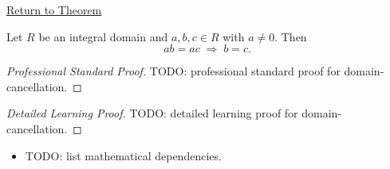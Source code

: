 \newpage
{}
\label{prf:domain-cancellation}

\begin{remark*}[Return]
\hyperref[prop:domain-cancellation]{Return to Theorem}
\end{remark*}

\begin{proposition*}
Let $R$ be an integral domain and $a, b, c \in R$ with $a \neq 0$.
Then
\[
ab = ac \;\Longrightarrow\; b = c.
\]
\end{proposition*}

\begin{proof}[Professional Standard Proof]
\LRAProofBodyStart
TODO: professional standard proof for domain-cancellation.
\end{proof}

\begin{proof}[Detailed Learning Proof]
\LRAProofBodyStart
TODO: detailed learning proof for domain-cancellation.
\end{proof}

\begin{remark*}
\end{remark*}

\begin{dependencies}
\begin{itemize}
  \item TODO: list mathematical dependencies.
\end{itemize}
\end{dependencies}

\clearpage
